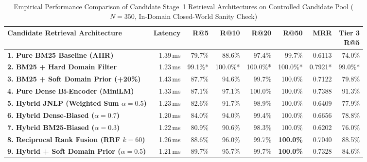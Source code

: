 \begin{table}[htbp]
    \centering
    \footnotesize
    \setlength{\tabcolsep}{3.5pt}
    \caption[Performance Comparison of Candidate Stage 1 Retrieval Architectures]{Empirical Performance Comparison of Candidate Stage~1 Retrieval Architectures on Controlled Candidate Pool ($N = 350$, In-Domain Closed-World Sanity Check)}
    \label{tab:stage1_retrieval_ablation}
    \begin{tabularx}{\linewidth}{>{\RaggedRight\arraybackslash}Xrrrrrrr}
        \toprule
        \textbf{Candidate Retrieval Architecture} & \textbf{Latency} & \textbf{R@5} & \textbf{R@10} & \textbf{R@20} & \textbf{R@50} & \textbf{MRR} & \shortstack[r]{\textbf{Tier 3}\\\textbf{R@5}} \\
        \midrule
        \textbf{1. Pure BM25 Baseline (AIIR)} & 1.39\,ms & 79.7\% & 88.6\% & 97.4\% & 99.7\% & 0.6113 & 74.0\% \\
        \textbf{2. BM25 + Hard Domain Filter} & 1.23\,ms & 99.1\%* & 100.0\%* & 100.0\%* & 100.0\%* & 0.7921* & 99.0\%* \\
        \textbf{3. BM25 + Soft Domain Prior (+20\%)} & 1.43\,ms & 87.7\% & 94.6\% & 99.7\% & 100.0\% & 0.7122 & 79.8\% \\
        \textbf{4. Pure Dense Bi-Encoder (MiniLM)} & 1.33\,ms & 87.1\% & 97.1\% & 100.0\% & 100.0\% & 0.7388 & 91.3\% \\
        \textbf{5. Hybrid JNLP (Weighted Sum $\alpha=0.5$)} & 1.23\,ms & 82.6\% & 91.7\% & 98.9\% & 100.0\% & 0.6409 & 77.9\% \\
        \textbf{6. Hybrid Dense-Biased ($\alpha=0.7$)} & 1.20\,ms & 84.0\% & 94.0\% & 99.4\% & 100.0\% & 0.6656 & 78.8\% \\
        \textbf{7. Hybrid BM25-Biased ($\alpha=0.3$)} & 1.22\,ms & 80.9\% & 90.6\% & 98.3\% & 100.0\% & 0.6202 & 76.0\% \\
        \textbf{8. Reciprocal Rank Fusion (RRF $k=60$)} & 1.26\,ms & 88.6\% & 96.0\% & 99.7\% & \textbf{100.0\%} & 0.7040 & 88.5\% \\
        \textbf{9. Hybrid + Soft Domain Prior ($\alpha=0.5$)} & 1.21\,ms & 89.7\% & 95.7\% & 99.7\% & \textbf{100.0\%} & 0.7328 & 84.6\% \\
        \bottomrule
    \end{tabularx}
\end{table}

